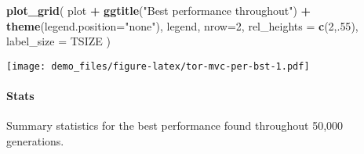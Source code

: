 \documentclass[]{book}
\newenvironment{Shaded}{\begin{snugshade}}{\end{snugshade}}
\newcommand{\DataTypeTok}[1]{\textcolor[rgb]{0.13,0.29,0.53}{#1}}
\newcommand{\DecValTok}[1]{\textcolor[rgb]{0.00,0.00,0.81}{#1}}
\newcommand{\KeywordTok}[1]{\textcolor[rgb]{0.13,0.29,0.53}{\textbf{#1}}}
\newcommand{\NormalTok}[1]{#1}
\newcommand{\OperatorTok}[1]{\textcolor[rgb]{0.81,0.36,0.00}{\textbf{#1}}}
\newcommand{\OtherTok}[1]{\textcolor[rgb]{0.56,0.35,0.01}{#1}}
\newcommand{\StringTok}[1]{\textcolor[rgb]{0.31,0.60,0.02}{#1}}
\let\oldparagraph\paragraph
\renewcommand{\paragraph}[1]{\oldparagraph{#1}\mbox{}}
\begin{document}
\begin{Shaded}
\begin{Highlighting}[]
\KeywordTok{plot_grid}\NormalTok{(}
\NormalTok{  plot }\OperatorTok{+}
\StringTok{    }\KeywordTok{ggtitle}\NormalTok{(}\StringTok{"Best performance throughout"}\NormalTok{) }\OperatorTok{+}
\StringTok{    }\KeywordTok{theme}\NormalTok{(}\DataTypeTok{legend.position=}\StringTok{"none"}\NormalTok{),}
\NormalTok{  legend,}
  \DataTypeTok{nrow=}\DecValTok{2}\NormalTok{,}
  \DataTypeTok{rel_heights =} \KeywordTok{c}\NormalTok{(}\DecValTok{2}\NormalTok{,.}\DecValTok{55}\NormalTok{),}
  \DataTypeTok{label_size =}\NormalTok{ TSIZE}
\NormalTok{)}
\end{Highlighting}
\end{Shaded}

\texttt{[image: demo\_files/figure-latex/tor-mvc-per-bst-1.pdf]}

\hypertarget{stats-37}{%
\paragraph{Stats}\label{stats-37}}

Summary statistics for the best performance found throughout 50,000 generations.

\begin{Shaded}
\end{Shaded}
\end{document}
